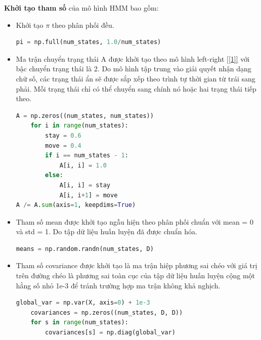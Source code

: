 \textbf{Khởi tạo tham số} của mô hình HMM bao gồm:
\begin{itemize}
    \item Khởi tạo \(\pi\) theo phân phối đều.
    
\begin{tcolorbox}
\begin{lstlisting}[language=Python]
    pi = np.full(num_states, 1.0/num_states)
\end{lstlisting}
\end{tcolorbox}

    \item Ma trận chuyển trạng thái A được khởi tạo theo mô hình left-right \ref{[1]} với bậc chuyển trạng thái là 2. Do mô hình tập trung vào giải quyết nhận dạng chữ số, các trạng thái ẩn sẽ được sắp xếp theo trình tự thời gian từ trái sang phải. Mỗi trạng thái chỉ có thể chuyển sang chính nó hoặc hai trạng thái tiếp theo.

\begin{tcolorbox}
\begin{lstlisting}[language=Python]
A = np.zeros((num_states, num_states))
    for i in range(num_states):
        stay = 0.6
        move = 0.4
        if i == num_states - 1:
            A[i, i] = 1.0
        else:
            A[i, i] = stay
            A[i, i+1] = move
A /= A.sum(axis=1, keepdims=True)
\end{lstlisting}
\end{tcolorbox}

    \item Tham số mean được khởi tạo ngẫu hiện theo phân phối chuẩn với mean = 0 và std = 1. Do tập dữ liệu huấn luyện đã được chuẩn hóa.
    
\begin{tcolorbox}
\begin{lstlisting}[language=Python]
    means = np.random.randn(num_states, D)
\end{lstlisting}
\end{tcolorbox}

    \item Tham số covariance được khởi tạo là ma trận hiệp phương sai chéo với giá trị trên đường chéo là phương sai toàn cục của tập dữ liệu huấn luyện cộng một hằng số nhỏ 1e-3 để tránh trường hợp ma trận không khả nghịch.
\begin{tcolorbox}
\begin{lstlisting}[language=Python]
    global_var = np.var(X, axis=0) + 1e-3
    covariances = np.zeros((num_states, D, D))
    for s in range(num_states):
        covariances[s] = np.diag(global_var)
\end{lstlisting}
\end{tcolorbox}
\end{itemize}

